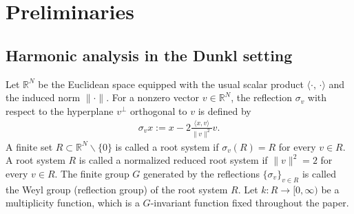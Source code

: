 \documentclass[12pt]{amsart}
\begin{document}
\author{Dmitriy Zanin}
\address{Dmitriy Zanin, University of New South Wales, Kensington, NSW 2052, Australia}






  \date{\today}





\begin{abstract}

\end{abstract}

\maketitle


\tableofcontents


\section{Preliminaries}
\setcounter{equation}{0}
\subsection{Harmonic analysis in the Dunkl setting}
Let $\mathbb{R}^N$ be the Euclidean space equipped with the usual scalar product $\langle \cdot,\,\cdot\rangle $ and the induced norm $\|\cdot\|$. For a nonzero vector $v\in \mathbb{R}^N$, the reflection $\sigma_v$ with respect to the hyperplane $v^{\perp}$ orthogonal to $v$ is defined by
\begin{align*}
	\sigma_v x:= x-2\frac{\langle x,v\rangle}{\|v\|^2}v.
\end{align*}
A finite set $R\subset \mathbb{R}^N\backslash \{0\}$ is called a root system if $\sigma_v(R)=R$ for every $v\in R$. A root system $R$ is called a normalized reduced root system if  $\|v\|^2=2$ for every $v\in R$.
The finite group $G$ generated by the reflections $\{\sigma_v\}_{v\in R}$ is called the Weyl group (reflection group) of the root system $R$.
Let $k: R \to [0,\infty)$ be a multiplicity function, which is a $G$-invariant function  fixed throughout the paper. 
\end{document}

